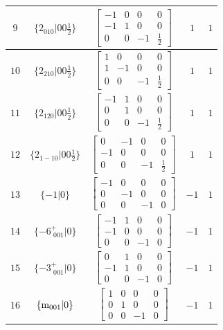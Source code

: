 \documentclass[fleqn,8pt]{jsarticle}
\begin{document}
\begin{longtable}{ccccc}
$ 9 $ & $ \{2{}_{010}|0 0 \frac{1}{2}\} $ & $ \begin{bmatrix} -1 & 0 & 0 & 0 \\ -1 & 1 & 0 & 0 \\ 0 & 0 & -1 & \frac{1}{2} \end{bmatrix} $ & $ 1 $ & $ 1 $ \\ \hline
$ 10 $ & $ \{2{}_{210}|0 0 \frac{1}{2}\} $ & $ \begin{bmatrix} 1 & 0 & 0 & 0 \\ 1 & -1 & 0 & 0 \\ 0 & 0 & -1 & \frac{1}{2} \end{bmatrix} $ & $ 1 $ & $ 1 $ \\ \hline
$ 11 $ & $ \{2{}_{120}|0 0 \frac{1}{2}\} $ & $ \begin{bmatrix} -1 & 1 & 0 & 0 \\ 0 & 1 & 0 & 0 \\ 0 & 0 & -1 & \frac{1}{2} \end{bmatrix} $ & $ 1 $ & $ 1 $ \\ \hline
$ 12 $ & $ \{2{}_{1-10}|0 0 \frac{1}{2}\} $ & $ \begin{bmatrix} 0 & -1 & 0 & 0 \\ -1 & 0 & 0 & 0 \\ 0 & 0 & -1 & \frac{1}{2} \end{bmatrix} $ & $ 1 $ & $ 1 $ \\ \hline
$ 13 $ & $ \{-1|0\} $ & $ \begin{bmatrix} -1 & 0 & 0 & 0 \\ 0 & -1 & 0 & 0 \\ 0 & 0 & -1 & 0 \end{bmatrix} $ & $ -1 $ & $ 1 $ \\ \hline
$ 14 $ & $ \{-6^{+}_{\,\,001}|0\} $ & $ \begin{bmatrix} -1 & 1 & 0 & 0 \\ -1 & 0 & 0 & 0 \\ 0 & 0 & -1 & 0 \end{bmatrix} $ & $ -1 $ & $ 1 $ \\ \hline
$ 15 $ & $ \{-3^{+}_{\,\,001}|0\} $ & $ \begin{bmatrix} 0 & 1 & 0 & 0 \\ -1 & 1 & 0 & 0 \\ 0 & 0 & -1 & 0 \end{bmatrix} $ & $ -1 $ & $ 1 $ \\ \hline
$ 16 $ & $ \{{\rm m}_{001}|0\} $ & $ \begin{bmatrix} 1 & 0 & 0 & 0 \\ 0 & 1 & 0 & 0 \\ 0 & 0 & -1 & 0 \end{bmatrix} $ & $ -1 $ & $ 1 $ \\ \hline

\end{longtable}
\end{document}
